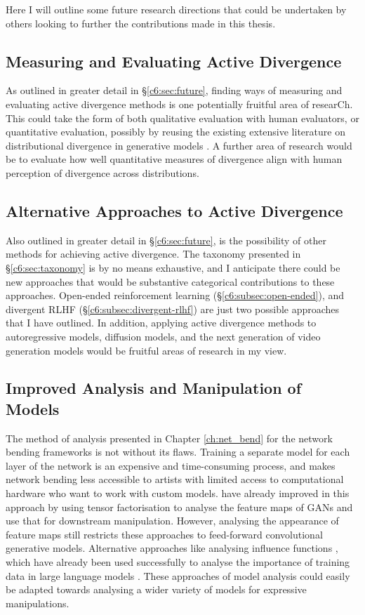 Here I will outline some future research directions that could be undertaken by others looking to further the contributions made in this thesis.

\subsection{Measuring and Evaluating Active Divergence}
As outlined in greater detail in \S \ref{c6:sec:future}, finding ways of measuring and evaluating active divergence methods is one potentially fruitful area of researCh.
This could take the form of both qualitative evaluation with human evaluators, or quantitative evaluation, possibly by reusing the existing extensive literature on distributional divergence in generative models \citep{gretton2019interpretable}.
A further area of research would be to evaluate how well quantitative measures of divergence align with human perception of divergence across distributions.

\subsection{Alternative Approaches to Active Divergence}
Also outlined in greater detail in \S \ref{c6:sec:future}, is the possibility of other methods for achieving active divergence. 
The taxonomy presented in \S \ref{c6:sec:taxonomy} is by no means exhaustive, and I anticipate there could be new approaches that would be substantive categorical contributions to these approaches. 
Open-ended reinforcement learning (\S \ref{c6:subsec:open-ended}), and divergent RLHF (\S \ref{c6:subsec:divergent-rlhf}) are just two possible approaches that I have outlined. 
In addition, applying active divergence methods to autoregressive models, diffusion models, and the next generation of video generation models would be fruitful areas of research in my view.

\subsection{Improved Analysis and Manipulation of Models}

The method of analysis presented in Chapter \ref{ch:net_bend} for the network bending frameworks is not without its flaws.
Training a separate model for each layer of the network is an expensive and time-consuming process, and makes network bending less accessible to artists with limited access to computational hardware who want to work with custom models.
\cite{oldfield2022panda,oldfield2024bilinear} have already improved in this approach by using tensor factorisation to analyse the feature maps of GANs and use that for downstream manipulation.
However, analysing the appearance of feature maps still restricts these approaches to feed-forward convolutional generative models.
Alternative approaches like analysing influence functions \citep{koh2017understanding}, which have already been used successfully to analyse the importance of training data in large language models \citep{choe2024your}.
These approaches of model analysis could easily be adapted towards analysing a wider variety of models for expressive manipulations.

